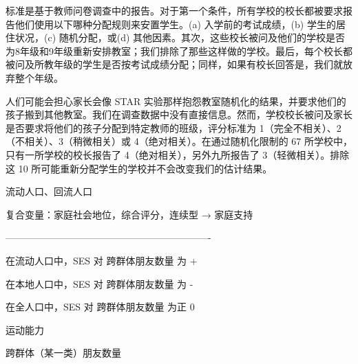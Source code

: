 标准是基于教师问卷调查中的报告。对于第一个条件，所有学校的校长都被要求报告他们使用以下哪种分配规则来安置学生。(a) 入学前的考试成绩，(b) 学生的居住状况，(c) 随机分配，或(d) 其他因素。其次，这些校长被问及他们的学校是否为8年级和9年级重新安排教室；我们排除了那些这样做的学校。最后，每个校长都被问及所教年级的学生是否按考试成绩分配；同样，如果有校长回答是，我们就放弃整个年级。

人们可能会担心家长会像 STAR 实验那样抱怨教室随机化的结果，并要求他们的孩子搬到其他教室。我们在调查数据中没有直接信息。然而，学校校长被问及家长是否要求将他们的孩子分配到特定教师的班级，评分标准为 1（完全不相关）、2（不相关）、3（稍微相关）或 4（绝对相关）。在通过随机化限制的 67 所学校中，只有一所学校的校长报告了 4（绝对相关），另外九所报告了 3（轻微相关）。排除这 10 所可能重新分配学生的学校并不会改变我们的估计结果。



流动人口、回流人口

复合变量：家庭社会地位，综合评分，连续型
→ 家庭支持

----------------------------------------------------------------


 在流动人口中，SES 对 跨群体朋友数量 为 +

 在本地人口中，SES 对 跨群体朋友数量 为 -

 在全人口中，SES 对 跨群体朋友数量 为正 0 


运动能力


跨群体（某一类）朋友数量